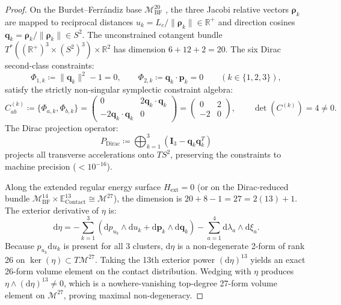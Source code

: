 \documentclass[11pt,a4paper,reqno]{article}
\theoremstyle{plain}
\theoremstyle{definition}
\theoremstyle{remark}
\numberwithin{equation}{section}
\numberwithin{table}{section}
\newcommand{\MbfTwenty}{\mathcal{M}_{\mathrm{BF}}^{20}}
\newcommand{\Mleaf}{\mathcal{M}^{27}}
\providecommand{\diff}{\mathrm{d}}
\begin{document}
\begin{proof}
On the Burdet--Ferr\'andiz base $\MbfTwenty$ \cite{burdet1969, ferrandiz1988}, the three Jacobi relative vectors $\bm{\rho}_k$ are mapped to reciprocal distances $u_k = L_c/\|\bm{\rho}_k\| \in \mathbb{R}^+$ and direction cosines $\bm{q}_k = \bm{\rho}_k/\|\bm{\rho}_k\| \in S^2$. The unconstrained cotangent bundle $T^*((\mathbb{R}^+)^3 \times (S^2)^3) \times \mathbb{R}^2$ has dimension $6 + 12 + 2 = 20$. 
The six Dirac second-class constraints:
\begin{equation}
  \Phi_{1,k} \coloneqq \|\bm{q}_k\|^2 - 1 = 0, \qquad \Phi_{2,k} \coloneqq \bm{q}_k \cdot \bm{p}_k = 0 \qquad (k \in \{1, 2, 3\}),
  \label{eq:dirac_constraints_master}
\end{equation}
satisfy the strictly non-singular symplectic constraint algebra:
\begin{equation}
  C_{ab}^{(k)} \coloneqq \{\Phi_{a,k}, \Phi_{b,k}\} = \begin{pmatrix} 0 & 2\bm{q}_k \cdot \bm{q}_k \\ -2\bm{q}_k \cdot \bm{q}_k & 0 \end{pmatrix} = \begin{pmatrix} 0 & 2 \\ -2 & 0 \end{pmatrix}, \qquad \det(C^{(k)}) = 4 \ne 0.
\end{equation}
The Dirac projection operator:
\begin{equation}
  P_{\mathrm{Dirac}} \coloneqq \bigoplus_{k=1}^3 \left( \bm{I}_3 - \bm{q}_k \bm{q}_k^T \right)
\end{equation}
projects all transverse accelerations onto $TS^2$, preserving the constraints to machine precision ($< 10^{-16}$). 

Along the extended regular energy surface $H_{\mathrm{ext}} = 0$ (or on the Dirac-reduced bundle $\mathcal{M}_{\mathrm{BF}}^{14} \times \mathbb{E}_{\mathrm{Contact}}^{13} \cong \Mleaf$), the dimension is $20 + 8 - 1 = 27 = 2(13) + 1$. The exterior derivative of $\eta$ is:
\begin{equation}
  \diff\eta = -\sum_{k=1}^3 \left( \diff p_{u_k} \wedge \diff u_k + \diff\bm{p}_k \wedge \diff\bm{q}_k \right) - \sum_{a=1}^4 \diff\lambda_a \wedge \diff\xi_a.
\end{equation}
Because $p_{u_k} \diff u_k$ is present for all 3 clusters, $\diff\eta$ is a non-degenerate 2-form of rank 26 on $\ker(\eta) \subset T\Mleaf$. Taking the 13th exterior power $(\diff\eta)^{13}$ yields an exact 26-form volume element on the contact distribution. Wedging with $\eta$ produces $\eta \wedge (\diff\eta)^{13} \ne 0$, which is a nowhere-vanishing top-degree 27-form volume element on $\Mleaf$, proving maximal non-degeneracy.
\end{proof}
\end{document}
